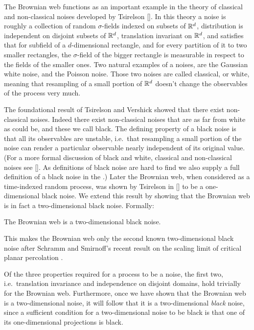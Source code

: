 {The Brownian web functions as an important example in the theory of classical
and non-classical noises developed by Tsirelson []. In this theory a noise is
roughly a collection of random $\sigma$-fields indexed on subsets of $\mathbb{R}^d$,
distribution is independent on disjoint subsets of $\mathbb{R}^d$, translation
invariant on $\mathbb{R}^d$, and satisfies that for subfield of a $d$-dimensional
rectangle, and for every partition of it to two smaller rectangles, the $\sigma$-field
of the bigger rectangle is measurable in respect to the fields of the
smaller ones. Two natural examples of a noises, are the Gaussian white noise,
and the Poisson noise. Those two noises are called classical, or white,
meaning that
resampling of a small portion of $\mathbb{R}^d$ doesn't change the observables of the
process very much.

The foundational result of Tsirelson and Vershick showed that there
exist non-classical noises.  Indeed there exist non-classical noises
that are as far from white as could be, and these we call black.  The
defining property of a black noise is that all its observables are
unstable, i.e.\ that resampling a small portion of the noise can
render a particular observable nearly independent of its original
value.  (For a more formal discussion of black and white, classical
and non-classical noises see [].  As definitions of black noise are
hard to find we also supply a full definition of a black noise in
the .)  Later the Brownian web,
when considered as a time-indexed random process,
was shown by Tsirelson in [] to be a one-dimensional black noise.  We
extend this
result by showing that the Brownian web is in fact a two-dimensional
black noise.  Formally:

\begin{theorem}
\label{thm:bw-2d-black-noise}
The Brownian web is a
two-dimensional black noise.
\end{theorem}

This makes the Brownian web only the second
known two-dimensional black noise after Schramm and Smirnoff's
recent result on the scaling limit of critical planar
percolation .

Of the three properties required for a process to be a noise, the
first two, i.e.\ translation invariance and independence on disjoint
domains, hold trivially for the Brownian web.  Furthermore, once we
have shown that the Brownian web is a two-dimensional noise, it will
follow that it is a two-dimensional \emph{black} noise, since a
sufficient condition for a two-dimensional noise to be black is that
one of its one-dimensional projections is black.

}
